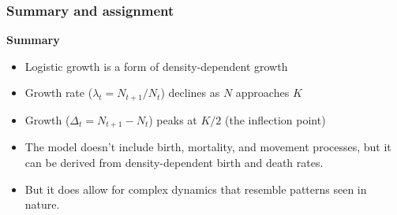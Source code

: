 \documentclass[color=usenames,dvipsnames]{beamer}\usepackage[]{graphicx}\usepackage[]{xcolor}
\begin{document}





\begin{frame}
  \frametitle{Summary and assignment}
  \large
  {\bf Summary}
  \begin{itemize}[<+->]
    \item Logistic growth is a form of density-dependent growth
    \item Growth rate ($\lambda_t=N_{t+1}/N_t$) declines as $N$ approaches $K$
    \item Growth ($\Delta_t=N_{t+1}-N_t$) peaks at $K/2$ (the
      inflection point)
    \item The model doesn't include birth, mortality, and movement
      processes, but it can be derived from density-dependent birth
      and death rates.  
    \item But it does allow for complex dynamics that resemble
      patterns seen in nature.
  \end{itemize}
  \vfill
\end{frame}
\end{document}
